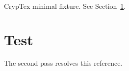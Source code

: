 \documentclass{article}
\begin{document}
CrypTex minimal fixture. See Section~\ref{sec:test}.
\section{Test}\label{sec:test}
The second pass resolves this reference.
\end{document}
